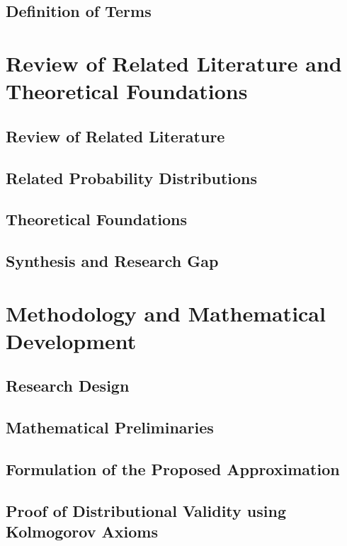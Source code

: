 \documentclass[11pt]{report}
\begin{document}
\section{Definition of Terms}


\chapter{Review of Related Literature and Theoretical Foundations}

\section{Review of Related Literature}

\section{Related Probability Distributions}

\section{Theoretical Foundations}

\section{Synthesis and Research Gap}


\chapter{Methodology and Mathematical Development}

\section{Research Design}

\section{Mathematical Preliminaries}

\section{Formulation of the Proposed Approximation}

\section{Proof of Distributional Validity using Kolmogorov Axioms}
\end{document}
